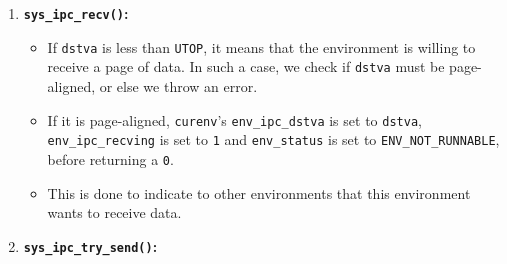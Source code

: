 \documentclass[]{article}
\begin{document}
\begin{enumerate}
\def\labelenumi{\arabic{enumi}.}
\itemsep1pt\parskip0pt
\item
  \textbf{\texttt{sys\_ipc\_recv()}:}

  \begin{itemize}
  \itemsep1pt\parskip0pt
  \item
    If \texttt{dstva} is less than \texttt{UTOP}, it means that the
    environment is willing to receive a page of data. In such a case, we
    check if \texttt{dstva} must be page-aligned, or else we throw an
    error.
  \item
    If it is page-aligned, \texttt{curenv}'s \texttt{env\_ipc\_dstva} is
    set to \texttt{dstva}, \texttt{env\_ipc\_recving} is set to
    \texttt{1} and \texttt{env\_status} is set to
    \texttt{ENV\_NOT\_RUNNABLE}, before returning a \texttt{0}.
  \item
    This is done to indicate to other environments that this environment
    wants to receive data.
  \end{itemize}
\item
  \textbf{\texttt{sys\_ipc\_try\_send()}:}


\end{enumerate}
\end{document}
